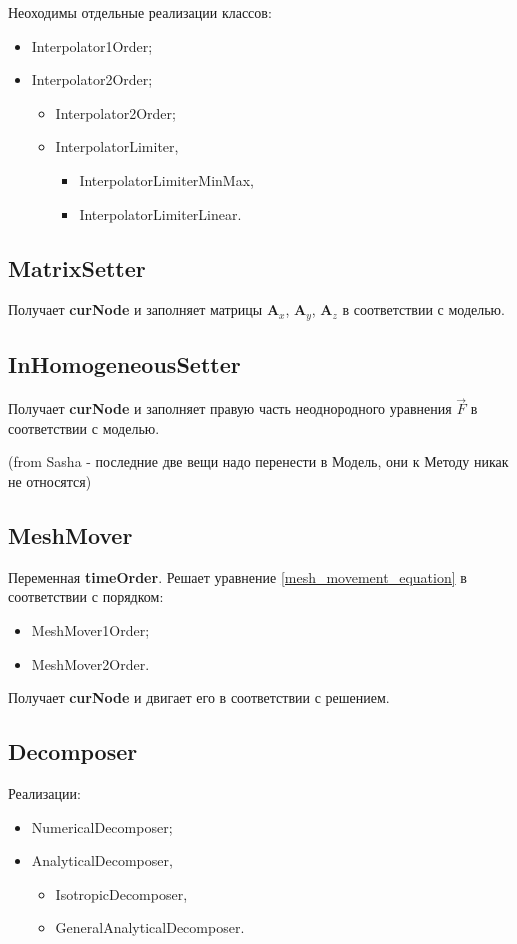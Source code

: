 \documentclass[a4paper,12pt]{article}
\numberwithin{equation}{section}
\begin{document}
	Неоходимы отдельные реализации классов:
	\begin{itemize}
		\item{Interpolator1Order;}
		\item{Interpolator2Order;}
		\begin{itemize}
				\item{Interpolator2Order;}
				\item{InterpolatorLimiter,}
				\begin{itemize}
					\item{InterpolatorLimiterMinMax,}
					\item{InterpolatorLimiterLinear.}
				\end{itemize}
		\end{itemize}
	\end{itemize}
	
\subsection{MatrixSetter}
	Получает \textbf{curNode} и заполняет матрицы $\mathbf{A}_x$, $\mathbf{A}_y$, $\mathbf{A}_z$ в соответствии с моделью.
	
\subsection{InHomogeneousSetter}
	Получает \textbf{curNode} и заполняет правую часть неоднородного уравнения $\vec{F}$ в соответствии с моделью.


(from Sasha - последние две вещи надо перенести в Модель, они к Методу никак не относятся)	

\subsection{MeshMover}
	Переменная \textbf{timeOrder}.
	Решает уравнение \eqref{mesh_movement_equation} в соответствии с порядком:
	\begin{itemize}
		\item{MeshMover1Order;}
		\item{MeshMover2Order.}
	\end{itemize}	
	
	Получает \textbf{curNode} и двигает его в соответствии с решением.

\subsection{Decomposer}
	Реализации:
	\begin{itemize}
			\item{NumericalDecomposer;}
			\item{AnalyticalDecomposer,}
			\begin{itemize}
					\item{IsotropicDecomposer,}
					\item{GeneralAnalyticalDecomposer.}
			\end{itemize}
	\end{itemize}
\end{document}
